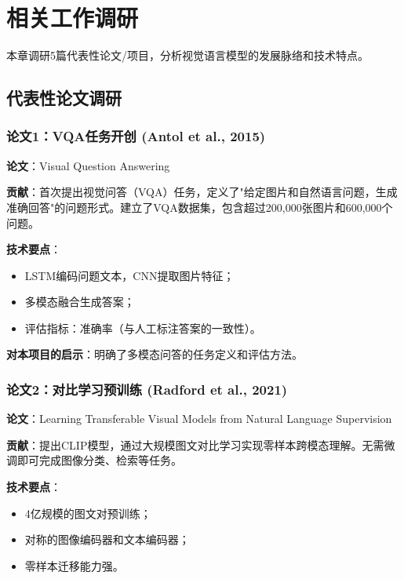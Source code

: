 
\chapter{相关工作调研}
\label{cha:related_work}

本章调研5篇代表性论文/项目，分析视觉语言模型的发展脉络和技术特点。

\section{代表性论文调研}
\label{sec:papers}

\subsection{论文1：VQA任务开创 (Antol et al., 2015)}

\textbf{论文}：Visual Question Answering\cite{antol2015vqa}

\textbf{贡献}：首次提出视觉问答（VQA）任务，定义了"给定图片和自然语言问题，生成准确回答"的问题形式。建立了VQA数据集，包含超过200,000张图片和600,000个问题。

\textbf{技术要点}：
\begin{itemize}
  \item LSTM编码问题文本，CNN提取图片特征；
  \item 多模态融合生成答案；
  \item 评估指标：准确率（与人工标注答案的一致性）。
\end{itemize}

\textbf{对本项目的启示}：明确了多模态问答的任务定义和评估方法。

\subsection{论文2：对比学习预训练 (Radford et al., 2021)}

\textbf{论文}：Learning Transferable Visual Models from Natural Language Supervision\cite{radford2021clip}

\textbf{贡献}：提出CLIP模型，通过大规模图文对比学习实现零样本跨模态理解。无需微调即可完成图像分类、检索等任务。

\textbf{技术要点}：
\begin{itemize}
  \item 4亿规模的图文对预训练；
  \item 对称的图像编码器和文本编码器；
  \item 零样本迁移能力强。
\end{itemize}

